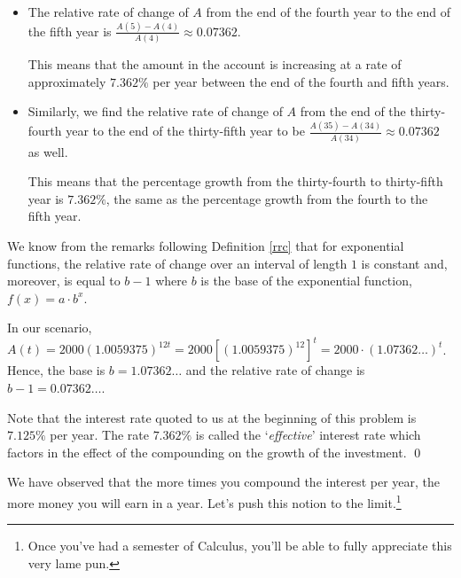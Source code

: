 \begin{ex}
\begin{enumerate}
\begin{itemize}

\item  The relative rate of change of $A$ from the end of the fourth year to the end of the fifth year is $\frac{A(5)-A(4)}{A(4)} \approx 0.07362$. 

\smallskip

This means that the amount in the account is increasing at a rate of approximately $7.362 \%$ per year between the end of the fourth and fifth years.

\item Similarly, we find the relative rate of change of $A$ from the end  of the thirty-fourth year to the end of the thirty-fifth year to be $\frac{A(35)-A(34)}{A(34)} \approx  0.07362$ as well.  

This means that the percentage growth from the thirty-fourth to thirty-fifth year is $7.362 \%$, the same as the percentage growth from the fourth to the fifth year.

\end{itemize}

We know from the remarks following Definition \ref{rrc} that for exponential functions, the relative rate of change over an interval of length $1$ is constant and, moreover, is equal to $b-1$ where $b$ is the base of the exponential function, $f(x) = a \cdot b^{x}$.  

\smallskip

In our scenario,  $A(t) = 2000 (1.0059375)^{12t} = 2000  \left[(1.0059375)^{12}\right]^{t} = 2000 \cdot (1.07362 \ldots)^t$.  Hence, the base is $b = 1.07362 \ldots$ and the relative rate of change is $b-1 = 0.07362 \ldots$.    

\smallskip

Note that the interest rate quoted to us at the beginning of this problem is $7.125 \%$ per year.  The rate $7.362 \%$ is called the `\textit{effective}' interest rate which factors in the effect of the compounding on the growth of the investment. \qed

\end{enumerate}

\end{ex}

We have observed that the more times you compound the interest per year, the more money you will earn in a year.  Let's push this notion to the limit.\footnote{Once you've had a semester of Calculus, you'll be able to fully appreciate this very lame pun.}  

